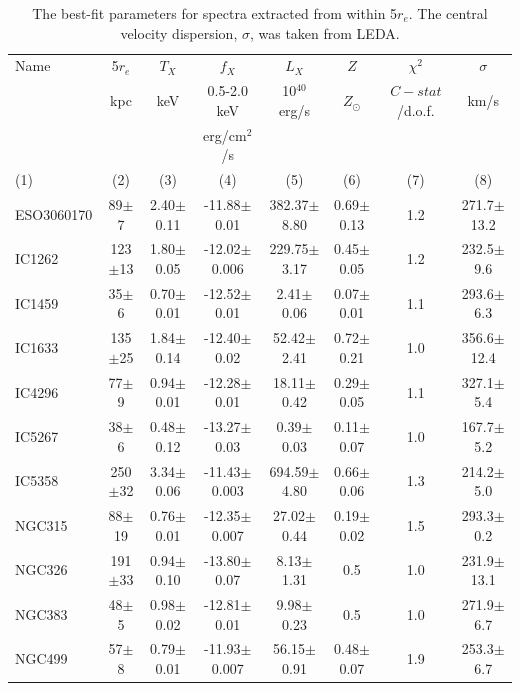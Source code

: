 \documentclass[iop]{emulateapj}
\begin{document}
\setcounter{table}{1}
\begin{table}
\centering
\caption{The best-fit parameters for spectra extracted from within 5$r_e$. The central velocity dispersion, $\sigma$, was taken from LEDA.}\label{tab2}
\begin{tabular}{lccccccc}
\hline
Name    & 5$r_e$ & $T_{X}$       &   $f_{X}$           & $L_X$             & $Z$     & $\chi^2$ &   $\sigma$            \\
        &   kpc       &   keV         &   0.5-2.0 keV       & 10$^{40}$ erg/s   &  $Z_{\odot}$        &  $C-stat$/d.o.f.   & km/s              \\
        &             &               &   erg/cm$^2$/s      &                   &         &           &                       \\
 (1)    &      (2)    &    (3)         &  (4)               &  (5)              &  (6)     &  (7)     &   (8)   \\   
\hline
ESO3060170 & 89$\pm$7  & 2.40$\pm$0.11 & -11.88$\pm$0.01  & 382.37$\pm$8.80  & 0.69$\pm$0.13 & 1.2  & 271.7$\pm$13.2 \\
IC1262  & 123$\pm$13  & 1.80$\pm$0.05 & -12.02$\pm$0.006 & 229.75$\pm$3.17 & 0.45$\pm$0.05 & 1.2  & 232.5$\pm$9.6\\
IC1459  & 35$\pm$6 & 0.70$\pm$0.01 & -12.52$\pm$0.01 & 2.41$\pm$0.06 & 0.07$\pm$0.01 & 1.1   & 293.6$\pm$6.3\\
IC1633  & 135$\pm$25 & 1.84$\pm$0.14 & -12.40$\pm$0.02 &  52.42$\pm$2.41  & 0.72$\pm$0.21  & 1.0  & 356.6$\pm$12.4\\
IC4296  & 77$\pm$9 & 0.94$\pm$0.01 & -12.28$\pm$0.01 & 18.11$\pm$0.42 & 0.29$\pm$0.05 & 1.1   & 327.1$\pm$5.4 \\
IC5267  & 38$\pm$6 & 0.48$\pm$0.12 & -13.27$\pm$0.03 & 0.39$\pm$0.03 & 0.11$\pm$0.07 & 1.0  & 167.7$\pm$5.2 \\
IC5358  & 250$\pm$32 & 3.34$\pm$0.06 & -11.43$\pm$0.003 & 694.59$\pm$4.80 & 0.66$\pm$0.06 & 1.3  & 214.2$\pm$5.0 \\
NGC315  & 88$\pm$19 & 0.76$\pm$0.01 & -12.35$\pm$0.007 & 27.02$\pm$0.44 & 0.19$\pm$0.02 & 1.5  & 293.3$\pm$0.2\\
NGC326  & 191$\pm$33 & 0.94$\pm$0.10 & -13.80$\pm$0.07 & 8.13$\pm$1.31 & 0.5 & 1.0  & 231.9$\pm$13.1\\
NGC383  & 48$\pm$5 & 0.98$\pm$0.02 & -12.81$\pm$0.01  & 9.98$\pm$0.23  & 0.5 & 1.0  & 271.9$\pm$6.7\\
NGC499  & 57$\pm$8 & 0.79$\pm$0.01 & -11.93$\pm$0.007 & 56.15$\pm$0.91 & 0.48$\pm$0.07 & 1.9  & 253.3$\pm$6.7\\

\end{tabular}
\end{table}
\end{document}
